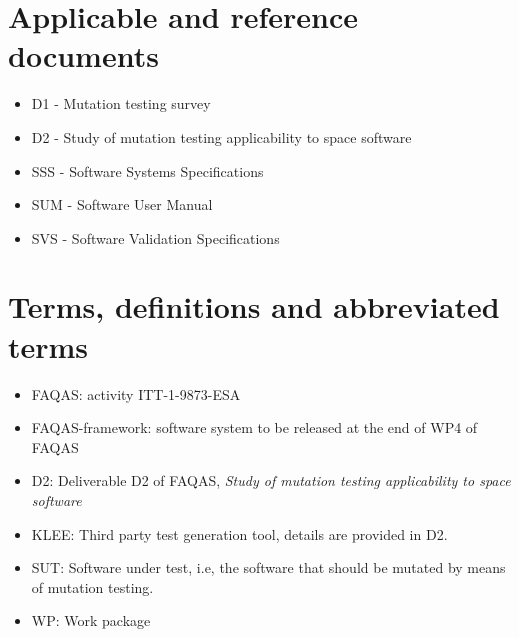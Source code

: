 \chapter{Applicable and reference documents}

\begin{itemize}
\item{D1 - Mutation testing survey}
\item{D2 - Study of mutation testing applicability to space software}
\item{SSS - Software Systems Specifications}
\item{SUM - Software User Manual}
\item{SVS - Software Validation Specifications}
\end{itemize}

\chapter{Terms, definitions and abbreviated terms}

\begin{itemize}
\item{FAQAS}: activity ITT-1-9873-ESA
\item{FAQAS-framework}: software system to be released at the end of WP4 of FAQAS
\item{D2}: Deliverable D2 of FAQAS, \emph{Study of mutation testing applicability to space software}
\item{KLEE}: Third party test generation tool, details are provided in D2.
\item{SUT}: Software under test, i.e, the software that should be mutated by means of mutation testing.
\item{WP}: Work package
\end{itemize}

\clearpage
 


